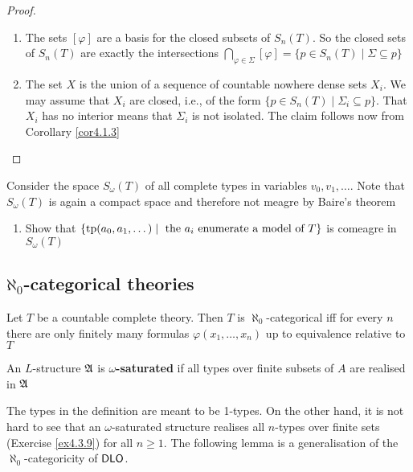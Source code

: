 \documentclass[11pt]{article}
\begin{document}
\begin{proof}
\begin{enumerate}
\item The sets \([\varphi]\) are a basis for the closed subsets of \(S_n(T)\). So the
closed sets of \(S_n(T)\) are exactly the intersections
\(\bigcap_{\varphi\in\Sigma}[\varphi]=\{p\in S_n(T)\mid\Sigma\subseteq p\}\)
\item The set \(X\) is the union of a sequence of countable nowhere dense sets
\(X_i\). We may assume that \(X_i\) are closed, i.e., of the form
\(\{p\in S_n(T)\mid \Sigma_i\subseteq p\}\). That \(X_i\) has no interior means
that \(\Sigma_i\) is not isolated. The claim follows now from Corollary \ref{cor4.1.3}
\end{enumerate}
\end{proof}




\begin{exercise}
\label{ex4.2.3}
Consider the space \(S_\omega(T)\) of all complete types in variables
\(v_0,v_1,\dots\). Note that \(S_\omega(T)\) is again a compact space and
therefore not meagre by Baire's theorem
\begin{enumerate}
\item Show that
\(\{\operatorname{tp}(a_0,a_1,\dots)\mid\text{ the $a_i$ enumerate a model of }T\}\)
 is comeagre in \(S_\omega(T)\)
\end{enumerate}
\end{exercise}
\subsection{\(ℵ_0\)-categorical theories}
\label{sec:org03569b3}
\begin{theorem}[]
\label{thm4.3.1}
Let \(T\) be a countable complete theory. Then \(T\) is
\(\aleph_0\)-categorical iff for every \(n\) there are only finitely many
formulas \(\varphi(x_1,\dots,x_n)\) up to equivalence relative to \(T\)
\end{theorem}

\begin{definition}[]
An \(L\)-structure \(\mathfrak{A}\) is \textbf{\(\omega\)-saturated} if all types over finite
subsets of \(A\) are realised in \(\mathfrak{A}\)
\end{definition}

The types in the definition are meant to be 1-types. On the other hand, it is
not hard to see that an \(\omega\)-saturated structure realises all
\(n\)-types over finite sets (Exercise \ref{ex4.3.9}) for all \(n\ge1\). The
following lemma is a generalisation of the \(\aleph_0\)-categoricity of \(\operatorname{\textsf{DLO}}\).
\end{document}
